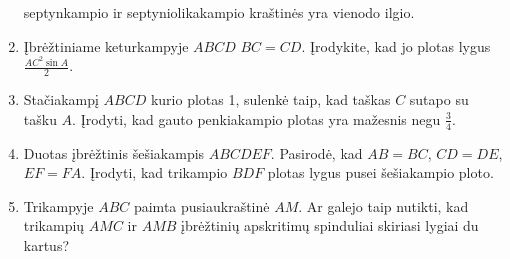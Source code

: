 \begin{enumerate}
  septynkampio ir septyniolikakampio kraštinės yra vienodo
  ilgio.
\item Įbrėžtiniame keturkampyje $ABCD$ $BC=CD$. Įrodykite,
  kad jo plotas lygus $\frac{AC^2\sin A}{2}$. 
\item Stačiakampį $ABCD$ kurio plotas 1, sulenkė taip, kad
  taškas $C$ sutapo su tašku $A$. Įrodyti, kad gauto
  penkiakampio plotas yra mažesnis negu $\frac{3}{4}$.
\item Duotas įbrėžtinis šešiakampis $ABCDEF$. Pasirodė, kad
  $AB=BC$, $CD=DE$, $EF=FA$. Įrodyti, kad trikampio $BDF$
  plotas lygus pusei šešiakampio ploto.
\item Trikampyje $ABC$ paimta pusiaukraštinė $AM$. Ar galejo
  taip nutikti, kad trikampių $AMC$ ir $AMB$ įbrėžtinių
  apskritimų spinduliai skiriasi lygiai du kartus?

\end{enumerate}
